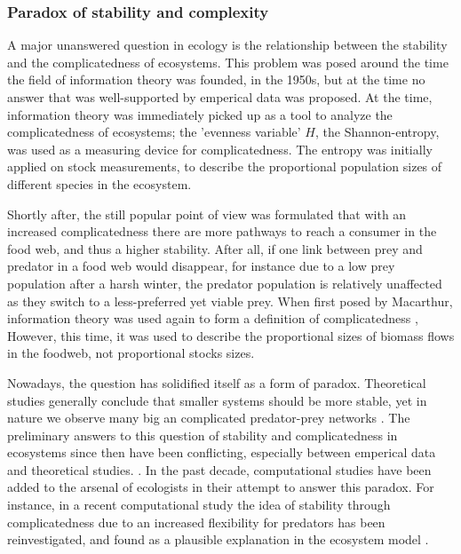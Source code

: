 \documentclass[../main.tex]{subfiles}
\begin{document}
\subsubsection{Paradox of stability and complexity}

A major unanswered question in ecology is the relationship between the stability and the complicatedness of ecosystems.
This problem was posed around the time the field of information theory was founded, in the 1950s, but at the time no answer that was well-supported by emperical data was proposed.
At the time, information theory was immediately picked up as a tool to analyze the complicatedness of ecosystems; the 'evenness variable' $H$, the Shannon-entropy, was used as a measuring device for complicatedness.
The entropy was initially applied on stock measurements, to describe the proportional population sizes of different species in the ecosystem.

Shortly after, the still popular point of view was formulated that with an increased complicatedness there are more pathways to reach a consumer in the food web, and thus a higher stability.
After all, if one link between prey and predator in a food web would disappear, for instance due to a low prey population after a harsh winter, the predator population is relatively unaffected as they switch to a less-preferred yet viable prey.
When first posed by Macarthur, information theory was used again to form a definition of complicatedness \cite{macarthur1955fluctuations},
However, this time, it was used to describe the proportional sizes of biomass flows in the foodweb, not proportional stocks sizes.

Nowadays, the question has solidified itself as a form of paradox.
Theoretical studies generally conclude that smaller systems should be more stable, yet in nature we observe many big an complicated predator-prey networks \cite{kondoh2003foraging}.
The preliminary answers to this question of stability and complicatedness in ecosystems since then have been conflicting, especially between emperical data and theoretical studies. \cite{pimm1984complexity}.
In the past decade, computational studies have been added to the arsenal of ecologists in their attempt to answer this paradox.
For instance, in a recent computational study the idea of stability through complicatedness due to an increased flexibility for predators has been reinvestigated, and found as a plausible explanation in the ecosystem model \cite{kondoh2003foraging}.
\end{document}
